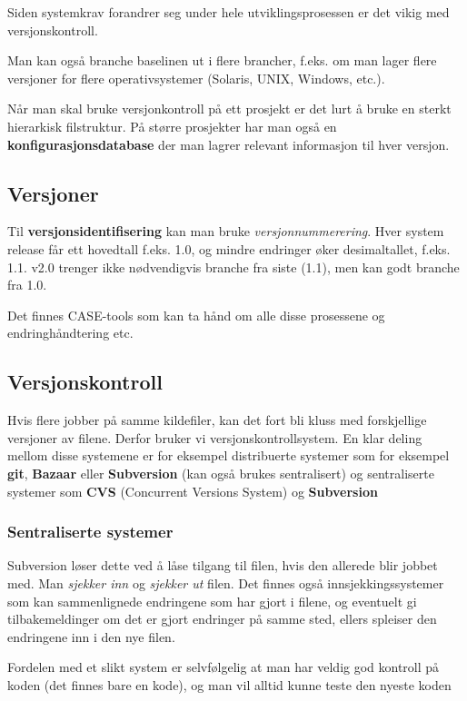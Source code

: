\documentclass[11pt]{article}
\begin{document}
  Siden systemkrav forandrer seg under hele utviklingsprosessen er det vikig med versjonskontroll. 
  
  Man kan også branche baselinen ut i flere brancher, f.eks. om man lager flere versjoner for 
  flere operativsystemer (Solaris, UNIX, Windows, etc.). 
  
  Når man skal bruke versjonkontroll på ett prosjekt er det lurt å bruke en sterkt 
  hierarkisk filstruktur. På større prosjekter har man også en \textbf{konfigurasjonsdatabase}
  der man lagrer relevant informasjon til hver versjon.
\subsection{Versjoner}
\label{sec-17.1}


  Til \textbf{versjonsidentifisering} kan man bruke \emph{versjonnummerering}. Hver system release 
  får ett hovedtall f.eks. 1.0, og mindre endringer øker desimaltallet, f.eks. 1.1. v2.0 
  trenger ikke nødvendigvis branche fra siste (1.1), men kan godt branche fra 1.0.
   
  Det finnes CASE-tools som kan ta hånd om alle disse prosessene og endringhåndtering etc.
\subsection{Versjonskontroll}
\label{sec-17.2}

   Hvis flere jobber på samme kildefiler, kan det fort bli kluss med forskjellige versjoner av filene. 
   Derfor bruker vi versjonskontrollsystem.
   En klar deling mellom disse systemene er for eksempel distribuerte systemer
   som for eksempel \textbf{git}, \textbf{Bazaar} eller \textbf{Subversion} (kan også brukes sentralisert)
   og sentraliserte systemer som \textbf{CVS} (Concurrent Versions System) og \textbf{Subversion}
\subsubsection{Sentraliserte systemer}
\label{sec-17.2.1}

    Subversion løser dette ved å låse tilgang til filen, hvis den allerede blir jobbet med. 
    Man \emph{sjekker inn} og \emph{sjekker ut} filen.
    Det finnes også innsjekkingssystemer som kan sammenlignede endringene som har gjort i filene, 
    og eventuelt gi tilbakemeldinger om det er gjort endringer på samme sted, ellers 
    spleiser den endringene inn i den nye filen.
    
    Fordelen med et slikt system er selvfølgelig at man har veldig god kontroll på koden
    (det finnes bare en kode), og man vil alltid kunne teste den nyeste koden
    
\end{document}
